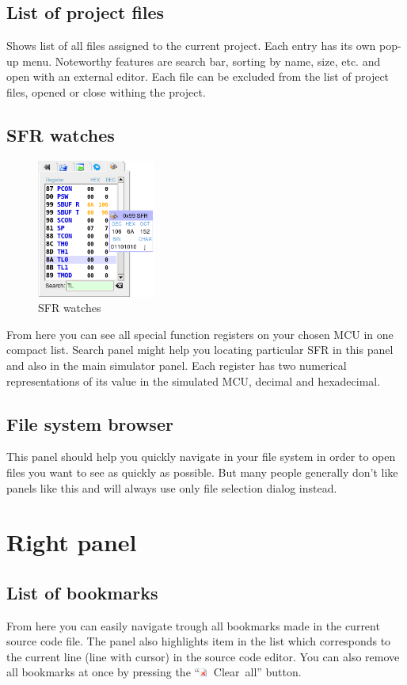 \documentclass[a4paper,twoside,12pt]{book}
\begin{document}
		\subsection{List of project files}
			Shows list of all files assigned to the current project. Each entry has its own pop-up menu. Noteworthy features are search bar, sorting by name, size, etc.  and open with an external editor. Each file can be excluded from the list of project files, opened or close withing the project.

		\subsection{SFR watches}
			\begin{figure}
				\centering{}
				\includegraphics[width=110pt]{img/032.png}
				\caption{SFR watches}
			\end{figure}
			From here you can see all special function registers on your chosen MCU in one compact list. Search panel might help you locating particular SFR in this panel and also in the main simulator panel. Each register has two numerical representations of its value in the simulated MCU, decimal and hexadecimal.

		\subsection{File system browser}
			This panel should help you quickly navigate in your file system in order to open files you want to see as quickly as possible. But many people generally don't like panels like this and will always use only file selection dialog instead.

	\section{Right panel}
		\subsection{List of bookmarks}
			From here you can easily navigate trough all bookmarks made in the current source code file. The panel also highlights item in the list which corresponds to the current line (line with cursor) in the source code editor. You can also remove all bookmarks at once by pressing the ``\includegraphics[height=8pt]{img/editdelete.png}~Clear~all'' button.
\end{document}
